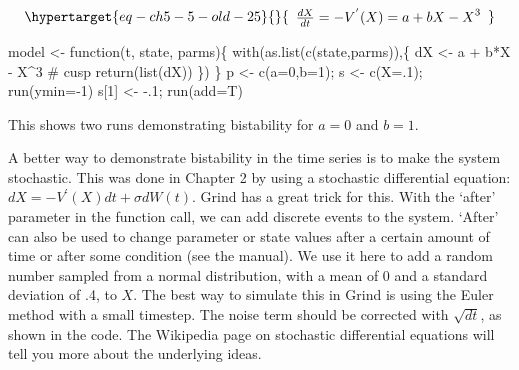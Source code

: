 \documentclass[
  letterpaper,
]{scrbook}
\newenvironment{Shaded}{\begin{snugshade}}{\end{snugshade}}
\newcommand{\AttributeTok}[1]{\textcolor[rgb]{0.40,0.45,0.13}{#1}}
\newcommand{\CommentTok}[1]{\textcolor[rgb]{0.37,0.37,0.37}{#1}}
\newcommand{\ControlFlowTok}[1]{\textcolor[rgb]{0.00,0.23,0.31}{#1}}
\newcommand{\DecValTok}[1]{\textcolor[rgb]{0.68,0.00,0.00}{#1}}
\newcommand{\FunctionTok}[1]{\textcolor[rgb]{0.28,0.35,0.67}{#1}}
\newcommand{\NormalTok}[1]{\textcolor[rgb]{0.00,0.23,0.31}{#1}}
\newcommand{\OtherTok}[1]{\textcolor[rgb]{0.00,0.23,0.31}{#1}}
\newcommand{\SpecialCharTok}[1]{\textcolor[rgb]{0.37,0.37,0.37}{#1}}
\begin{document}
\begin{equation}\protect\hypertarget{eq-ch5-5-old-25}{}{\begin{array}{r}
\frac{dX}{dt} = - V^{'}(X) = {a + bX - X}^{3}
\end{array}}\label{eq-ch5-5-old-25}\end{equation}

\begin{Shaded}
\begin{Highlighting}[]
\NormalTok{model }\OtherTok{\textless{}{-}} \ControlFlowTok{function}\NormalTok{(t, state, parms)\{}
  \FunctionTok{with}\NormalTok{(}\FunctionTok{as.list}\NormalTok{(}\FunctionTok{c}\NormalTok{(state,parms)),\{}
\NormalTok{    dX }\OtherTok{\textless{}{-}}\NormalTok{  a }\SpecialCharTok{+}\NormalTok{ b}\SpecialCharTok{*}\NormalTok{X }\SpecialCharTok{{-}}\NormalTok{ X}\SpecialCharTok{\^{}}\DecValTok{3}        \CommentTok{\# cusp}
    \FunctionTok{return}\NormalTok{(}\FunctionTok{list}\NormalTok{(dX))}
\NormalTok{  \})}
\NormalTok{\}}
\NormalTok{p }\OtherTok{\textless{}{-}} \FunctionTok{c}\NormalTok{(}\AttributeTok{a=}\DecValTok{0}\NormalTok{,}\AttributeTok{b=}\DecValTok{1}\NormalTok{); s }\OtherTok{\textless{}{-}} \FunctionTok{c}\NormalTok{(}\AttributeTok{X=}\NormalTok{.}\DecValTok{1}\NormalTok{); }\FunctionTok{run}\NormalTok{(}\AttributeTok{ymin=}\SpecialCharTok{{-}}\DecValTok{1}\NormalTok{)}
\NormalTok{s[}\DecValTok{1}\NormalTok{] }\OtherTok{\textless{}{-}} \SpecialCharTok{{-}}\NormalTok{.}\DecValTok{1}\NormalTok{; }\FunctionTok{run}\NormalTok{(}\AttributeTok{add=}\NormalTok{T)}
\end{Highlighting}
\end{Shaded}

This shows two runs demonstrating bistability for \(a = 0\) and
\(b = 1\).

A better way to demonstrate bistability in the time series is to make
the system stochastic. This was done in Chapter 2 by using a stochastic
differential equation: \(dX = - V^{'}(X)dt + \sigma dW(t)\). Grind has a
great trick for this. With the `after' parameter in the function call,
we can add discrete events to the system. `After' can also be used to
change parameter or state values after a certain amount of time or after
some condition (see the manual). We use it here to add a random number
sampled from a normal distribution, with a mean of 0 and a standard
deviation of .4, to \(X\). The best way to simulate this in Grind is
using the Euler method with a small timestep. The noise term should be
corrected with \(\sqrt{dt}\), as shown in the code. The Wikipedia page
on stochastic differential equations will tell you more about the
underlying ideas.
\end{document}
